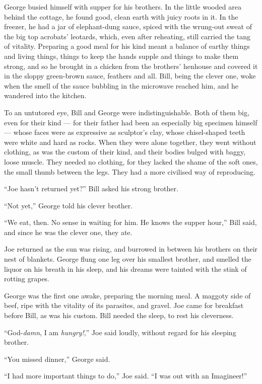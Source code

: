 George busied himself with supper for his brothers. In the little
wooded area behind the cottage, he found good, clean earth with
juicy roots in it. In the freezer, he had a jar of elephant-dung
sauce, spiced with the wrung-out sweat of the big top acrobats'
leotards, which, even after reheating, still carried the tang of
vitality. Preparing a good meal for his kind meant a balance of
earthy things and living things, things to keep the hands supple
and things to make them strong, and so he brought in a chicken from
the brothers' henhouse and covered it in the sloppy green-brown
sauce, feathers and all. Bill, being the clever one, woke when the
smell of the sauce bubbling in the microwave reached him, and he
wandered into the kitchen.

To an untutored eye, Bill and George were indistinguishable. Both
of them big, even for their kind --- for their father had been an
especially big specimen himself --- whose faces were as expressive
as sculptor's clay, whose chisel-shaped teeth were white and hard
as rocks. When they were alone together, they went without
clothing, as was the custom of their kind, and their bodies bulged
with baggy, loose muscle. They needed no clothing, for they lacked
the shame of the soft ones, the small thumb between the legs. They
had a more civilised way of reproducing.

``Joe hasn't returned yet?'' Bill asked his strong brother.

``Not yet,'' George told his clever brother.

``We eat, then. No sense in waiting for him. He knows the supper hour,''
Bill said, and since he was the clever one, they ate.

\tb

Joe returned as the sun was rising, and burrowed in between his
brothers on their nest of blankets. George flung one leg over his
smallest brother, and smelled the liquor on his breath in his
sleep, and his dreams were tainted with the stink of rotting
grapes.

George was the first one awake, preparing the morning meal. A
maggoty side of beef, ripe with the vitality of its parasites, and
gravel. Joe came for breakfast before Bill, as was his custom. Bill
needed the sleep, to rest his cleverness.

``God-\emph{damn}, I am \emph{hungry!},'' Joe said loudly, without
regard for his sleeping brother.

``You missed dinner,'' George said.

``I had more important things to do,'' Joe said.
``I was out with an Imagineer!''

